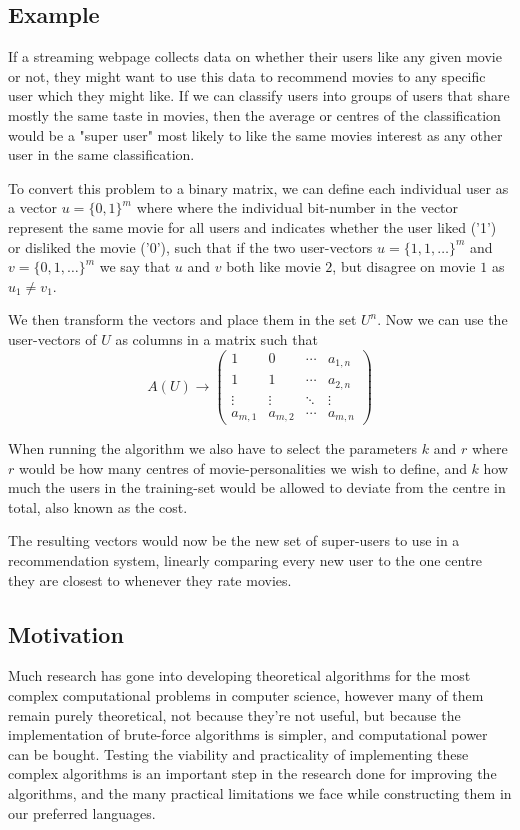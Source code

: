 \documentclass[a4paper]{article}
\begin{document}
\subsection{Example}
If a streaming webpage collects data on whether their users like any given movie or not,
they might want to use this data to recommend movies to any specific user which they might like.
If we can classify users into groups of users that share mostly the same taste in movies, then
the average or centres of the classification would be a "super user" most likely to like the same movies
interest as any other user in the same classification.

To convert this problem to a binary matrix, we can define each individual user as a vector
$u=\{0,1\}^m$ where where the individual bit-number in the vector represent the same movie for all users
and indicates whether the user liked ('1') or disliked the movie ('0'), such that if the two
user-vectors $u=\{1,1,\ldots\}^m$ and $v=\{0,1,\ldots\}^m$ we say that $u$ and $v$ both like movie $2$,
but disagree on movie $1$ as $u_1 \neq v_1$.

We then transform the vectors and place them in the set $U^n$. Now we can use the user-vectors of $U$
as columns in a matrix such that
\[
    A(U)  \rightarrow \begin{pmatrix}
        1       & 0       & \cdots & a_{1,n} \\
        1       & 1       & \cdots & a_{2,n} \\
        \vdots  & \vdots  & \ddots & \vdots  \\
        a_{m,1} & a_{m,2} & \cdots & a_{m,n}
    \end{pmatrix}
\]

When running the algorithm we also have to select the parameters $k$ and $r$ where $r$ would be
how many centres of movie-personalities we wish to define, and $k$ how much the users in
the training-set would be allowed to deviate from the centre in total, also known as the cost.

The resulting vectors would now be the new set of super-users to use in a recommendation system,
linearly comparing every new user to the one centre they are closest to whenever they rate movies.

\subsection{Motivation}
Much research has gone into developing theoretical algorithms for the most complex computational
problems in computer science, however many of them remain purely theoretical, not because
they're not useful, but because the implementation of brute-force algorithms is simpler, and
computational power can be bought. Testing the viability and practicality of implementing
these complex algorithms is an important step in the research done for improving the
algorithms, and the many practical limitations we face while constructing them in our
preferred languages.
\end{document}
